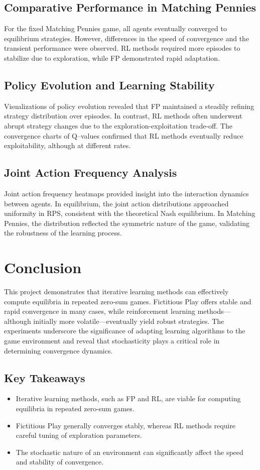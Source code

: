 \documentclass[11pt]{article}
\begin{document}
\subsection{Comparative Performance in Matching Pennies}
For the fixed Matching Pennies game, all agents eventually converged to equilibrium strategies. However, differences in the speed of convergence and the transient performance were observed. RL methods required more episodes to stabilize due to exploration, while FP demonstrated rapid adaptation.

\subsection{Policy Evolution and Learning Stability}
Visualizations of policy evolution revealed that FP maintained a steadily refining strategy distribution over episodes. In contrast, RL methods often underwent abrupt strategy changes due to the exploration-exploitation trade-off. The convergence charts of Q–values confirmed that RL methods eventually reduce exploitability, although at different rates.

\subsection{Joint Action Frequency Analysis}
Joint action frequency heatmaps provided insight into the interaction dynamics between agents. In equilibrium, the joint action distributions approached uniformity in RPS, consistent with the theoretical Nash equilibrium. In Matching Pennies, the distribution reflected the symmetric nature of the game, validating the robustness of the learning process.

\section{Conclusion}
This project demonstrates that iterative learning methods can effectively compute equilibria in repeated zero-sum games. Fictitious Play offers stable and rapid convergence in many cases, while reinforcement learning methods—although initially more volatile—eventually yield robust strategies. The experiments underscore the significance of adapting learning algorithms to the game environment and reveal that stochasticity plays a critical role in determining convergence dynamics.

\subsection*{Key Takeaways}
\begin{itemize}
    \item Iterative learning methods, such as FP and RL, are viable for computing equilibria in repeated zero-sum games.
    \item Fictitious Play generally converges stably, whereas RL methods require careful tuning of exploration parameters.
    \item The stochastic nature of an environment can significantly affect the speed and stability of convergence.
\end{itemize}
\end{document}
